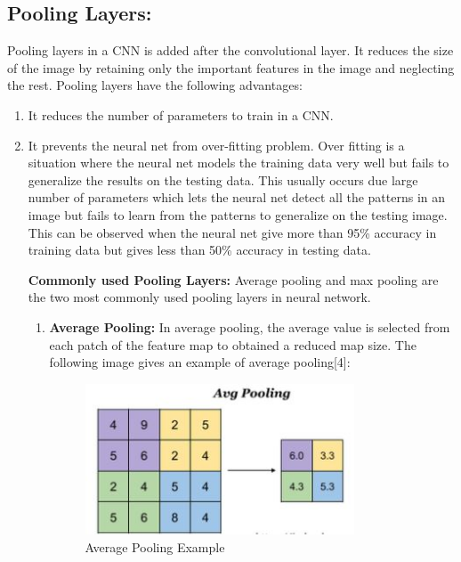 \documentclass{IEEEtran}
\begin{document}
\subsection{\textbf{Pooling Layers:}}
Pooling layers in a CNN is added after the convolutional layer. It reduces the size of the image by retaining only the important features in the image and neglecting the rest. Pooling layers have the following advantages:
\begin{enumerate}
\item It reduces the number of parameters to train in a CNN.
\item It prevents the neural net from over-fitting problem. Over fitting is a situation where the neural net models the training data very well but fails to generalize the results on the testing data. This usually occurs due large number of parameters which lets the neural net detect all the patterns in an image but fails to learn from the patterns to generalize on the testing image. This can be observed when the neural net give more than 95\% accuracy in training data but gives less than 50\% accuracy in testing data.

\textbf{Commonly used Pooling Layers:} Average pooling and max pooling are the two most commonly used pooling layers in neural network.
\begin{enumerate}
\item \textbf{Average Pooling:} In average pooling, the average value is selected from each patch of the feature map to obtained a reduced map size. The following image gives an example of average pooling[4]:

\begin{figure}[h]
    \centering
    \captionsetup{justification=centering}
    \includegraphics[width=8cm]{avgpool}
    \caption{Average Pooling Example}
    \label{fig:Average Pooling Example}
\end{figure}


\end{enumerate}
\end{enumerate}
\end{document}
